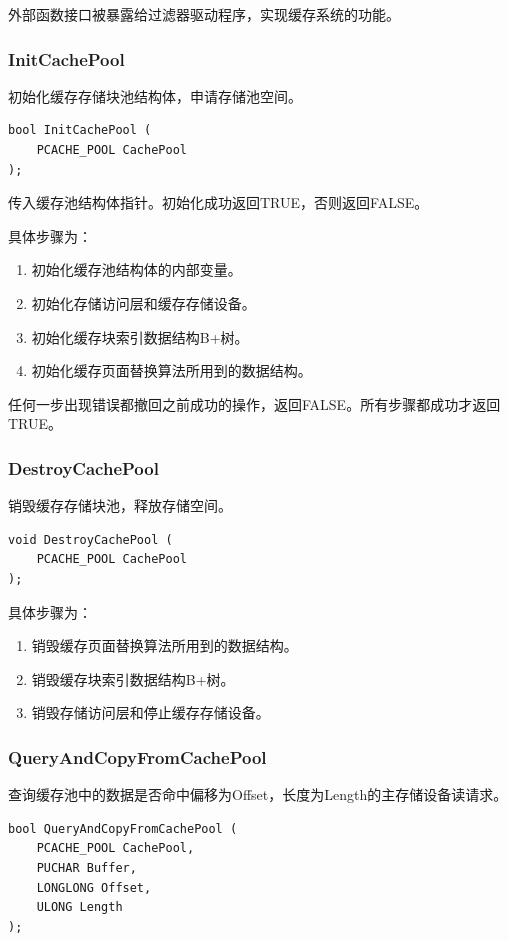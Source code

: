 外部函数接口被暴露给过滤器驱动程序，实现缓存系统的功能。

\subsubsection{InitCachePool}
初始化缓存存储块池结构体，申请存储池空间。
\begin{lstlisting}
bool InitCachePool (
    PCACHE_POOL CachePool
);
\end{lstlisting}

传入缓存池结构体指针。初始化成功返回TRUE，否则返回FALSE。

具体步骤为：
\begin{enumerate}
\item 初始化缓存池结构体的内部变量。
\item 初始化存储访问层和缓存存储设备。
\item 初始化缓存块索引数据结构B+树。
\item 初始化缓存页面替换算法所用到的数据结构。
\end{enumerate}

任何一步出现错误都撤回之前成功的操作，返回FALSE。所有步骤都成功才返回TRUE。

\subsubsection{DestroyCachePool}
销毁缓存存储块池，释放存储空间。
\begin{lstlisting}
void DestroyCachePool (
    PCACHE_POOL CachePool
);
\end{lstlisting}

具体步骤为：

\begin{enumerate}
\item 销毁缓存页面替换算法所用到的数据结构。
\item 销毁缓存块索引数据结构B+树。
\item 销毁存储访问层和停止缓存存储设备。
\end{enumerate}

\subsubsection{QueryAndCopyFromCachePool}
查询缓存池中的数据是否命中偏移为Offset，长度为Length的主存储设备读请求。
\begin{lstlisting}
bool QueryAndCopyFromCachePool (
    PCACHE_POOL CachePool,
    PUCHAR Buffer,
    LONGLONG Offset,
    ULONG Length
);
\end{lstlisting}

